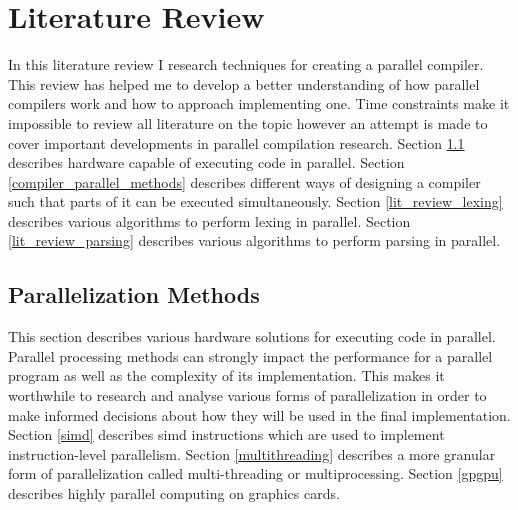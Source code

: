 \chapter{Literature Review} \label{litreview}

In this literature review I research techniques for creating a parallel
compiler. This review has helped me to develop a better understanding of how
parallel compilers work and how to approach implementing one. Time constraints
make it impossible to review all literature on the topic however
an attempt is made to cover important developments in parallel compilation
research.
\newline \newline
Section \ref{parallelisation_methods} describes hardware capable of executing
code in parallel.
\newline \newline
Section \ref{compiler_parallel_methods} describes different ways of designing a
compiler such that parts of it can be executed simultaneously.
\newline \newline
Section \ref{lit_review_lexing} describes various algorithms to perform lexing
in parallel.
\newline \newline
Section \ref{lit_review_parsing} describes various algorithms to perform parsing
in parallel.
\newline \newline

\section{Parallelization Methods} \label{parallelisation_methods}
This section describes various hardware solutions for executing code in
parallel. Parallel processing methods can strongly impact the performance
for a parallel program as well as the complexity of its implementation. This
makes it worthwhile to research and analyse various forms of parallelization
in order to make informed decisions about how they will be used in the final
implementation.
\newline \newline
Section \ref{simd} describes \gls{simd} instructions which are used to implement
instruction-level parallelism.
\newline \newline
Section \ref{multithreading} describes a more granular form of parallelization
called multi-threading or multiprocessing.
\newline \newline
Section \ref{gpgpu} describes highly parallel computing on graphics cards.

